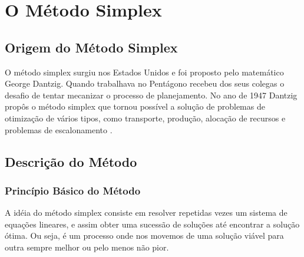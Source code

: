 \chapter{O Método Simplex}

\section{Origem do Método Simplex}
O método simplex surgiu nos Estados Unidos e foi proposto pelo matemático George Dantzig. Quando trabalhava no Pentágono recebeu dos seus colegas o desafio de tentar mecanizar o processo de planejamento. No ano de 1947 Dantzig propôs o método simplex que tornou possível a solução de problemas de otimização de vários tipos, como transporte, produção, alocação de recursos e problemas de escalonamento \cite{OrigemSimplex}.

\section{Descrição do Método}
\subsection{Princípio Básico do Método}
A idéia do método simplex consiste em resolver repetidas vezes um sistema de equações lineares, e assim obter uma sucessão de soluções até encontrar a solução ótima. Ou seja, é um processo onde nos movemos de uma solução viável para outra sempre melhor ou pelo menos não pior.

